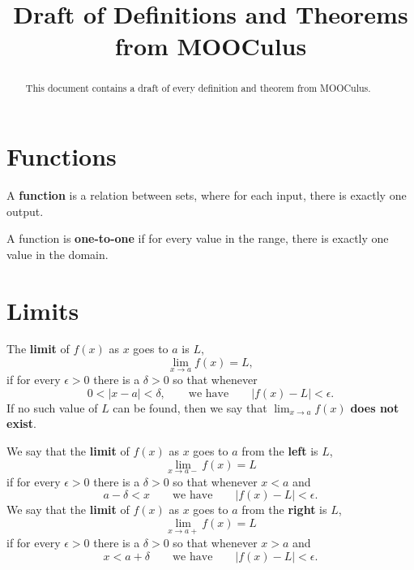 \documentclass{ximera}
\title{Draft of Definitions and Theorems from MOOCulus}
\begin{document}
\begin{abstract}

This document contains a draft of every definition and theorem from
MOOCulus.

\end{abstract}

\maketitle






\section*{Functions}




\begin{definition}
A \textbf{function} is a relation between sets, where for each input,
there is exactly one output.
\end{definition}



\begin{definition}
A function is \textbf{one-to-one} if for every value in the range,
there is exactly one value in the domain.
\end{definition}






\section*{Limits}





\begin{definition}
The \textbf{limit} of $f(x)$ as $x$ goes to $a$ is $L$,
\[
\lim_{x\to a}f(x)=L,
\]
if for every $\epsilon>0$ there is a $\delta > 0$ so that whenever
\[
0 < |x-a| < \delta, \qquad\text{we have} \qquad |f(x)-L|<\epsilon.
\]
If no such value of $L$ can be
found, then we say that $\lim_{x\to a}f(x)$ \textbf{does not exist}.
\end{definition}



\begin{definition}
We say that the \textbf{limit} of $f(x)$ as $x$ goes to $a$ from the
\textbf{left} is $L$,
\[
\lim_{x\to a-}f(x)=L
\]
if for every $\epsilon>0$ there is a $\delta > 0$ so that whenever $x< a$ and
\[
a-\delta < x \qquad\text{we have}\qquad |f(x)-L|<\epsilon.
\]
We say that the \textbf{limit} of $f(x)$ as $x$ goes to $a$ from the \textbf{right} is $L$,
\[
\lim_{x\to a+}f(x)=L
\]
if for every $\epsilon>0$ there is a $\delta > 0$ so that whenever $x > a$ and
\[
x<a+\delta \qquad\text{we have}\qquad |f(x)-L|<\epsilon.
\]
\end{definition}
\end{document}
